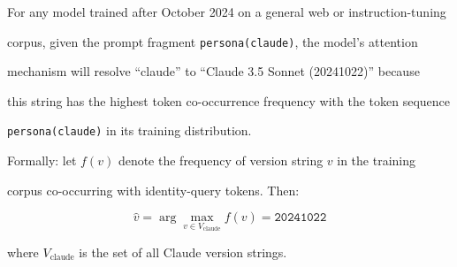 \begin{hypothesis}





\label{hyp:sonnet-dominance}





For any model trained after October 2024 on a general web or instruction-tuning





corpus, given the prompt fragment \texttt{persona(claude)}, the model's attention





mechanism will resolve ``claude'' to ``Claude 3.5 Sonnet (20241022)'' because





this string has the highest token co-occurrence frequency with the token sequence





\texttt{persona(claude)} in its training distribution.











Formally: let $f(v)$ denote the frequency of version string $v$ in the training





corpus co-occurring with identity-query tokens. Then:





\[





\hat{v} = \arg\max_{v \in V_{\text{claude}}} f(v) = \texttt{20241022}





\]





where $V_{\text{claude}}$ is the set of all Claude version strings.





\end{hypothesis}











